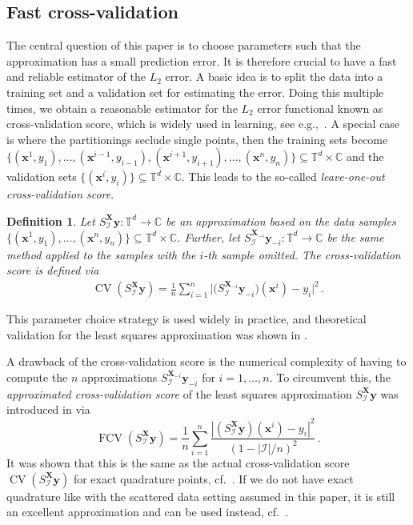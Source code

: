 \documentclass[a4paper]{scrartcl}
\numberwithin{equation}{section}
\newtheorem{defi}[theorem]{Definition}
\DeclareMathOperator{\CV}{CV}
\DeclareMathOperator{\FCV}{FCV}
\begin{document}
\subsection{Fast cross-validation}\label{sec:fcv} 

The central question of this paper is to choose parameters such that the approximation has a small prediction error.
It is therefore crucial to have a fast and reliable estimator of the $L_2$ error.
A basic idea is to split the data into a training set and a validation set for estimating the error.
Doing this multiple times, we obtain a reasonable estimator for the $L_2$ error functional known as cross-validation score, which is widely used in learning, see e.g.,~\cite{TaWe96, BS02, MS00, Rosset09, DPR10}.
A special case is where the partitionings seclude single points, then the training sets become $\{(\bm x^1, y_1), \dots, (\bm x^{i-1}, y_{i-1}), (\bm x^{i+1}, y_{i+1}), \dots, (\bm x^n, y_n)\}\subseteq\mathds T^d\times\mathds C$ and the validation sets $\{(\bm x^i, y_i)\}\subseteq\mathds T^d\times\mathds C$.
This leads to the so-called \emph{leave-one-out cross-validation score}.

\begin{defi} Let $S_{\mathcal I}^{\bm X}\bm y\colon\mathds T^d\to\mathds C$ be an approximation based on the data samples $\{(\bm x^1, y_1), \dots, (\bm x^n, y_n)\} \subseteq \mathds T^d\times \mathds C$.
    Further, let $S_{\mathcal I}^{\bm X_{-i}}\bm y_{-i}\colon\mathds T^d\to\mathds C$ be the same method applied to the samples with the $i$-th sample omitted.
    The \emph{cross-validation score} is defined via
    \begin{align*}
        \CV(S_{\mathcal I}^{\bm X}\bm y)
        = \frac 1 n \sum_{i=1}^{n} \Big|\Big(S_{\mathcal I}^{\bm X_{-i}}{\bm y_{-i}}\Big)(\bm x^i)-y_i \Big|^2 \,.
    \end{align*}
\end{defi} 

This parameter choice strategy is used widely in practice, and theoretical validation for the least squares approximation was shown in \cite[Corollary~9.11]{Barteldiss}.

A drawback of the cross-validation score is the numerical complexity of having to compute the $n$ approximations $S_{\mathcal I}^{\bm X_{-i}}\bm y_{-i}$ for $i=1,\dots,n$.
To circumvent this, the \emph{approximated cross-validation score} of the least squares approximation $S_{\mathcal I}^{\bm X}\bm y$ was introduced in \cite{BHP20} via
\begin{equation}\label{eq:fcv}
    \FCV(S_{\mathcal I}^{\bm X}\bm y)
    = \frac 1n \sum_{i=1}^n \frac{|(S_{\mathcal I}^{\bm X}\bm y)(\bm x^i)-y_i|^2}{(1-|\mathcal I|/n)^2} \,.
\end{equation}
It was shown that this is the same as the actual cross-validation score $\CV(S_{\mathcal I}^{\bm X}\bm y)$ for exact quadrature points, cf.\ \cite{BHP20}.
If we do not have exact quadrature like with the scattered data setting assumed in this paper, it is still an excellent approximation and can be used instead, cf.\ \cite[Theorem~9.20]{Barteldiss}.
\end{document}
